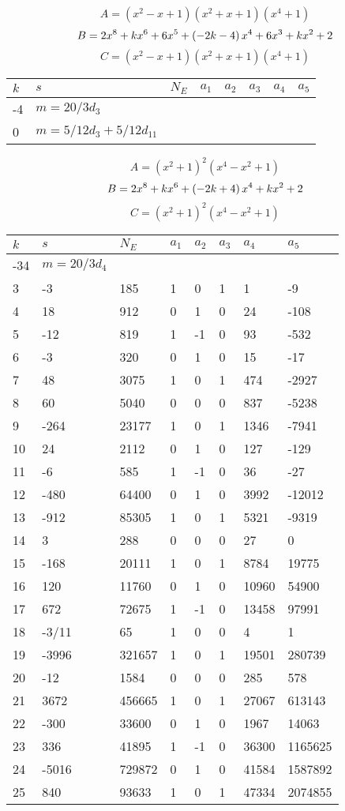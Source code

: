 \documentclass{amsart}
\begin{document}
$$A=(x^2
 - x
 + 1)(x^2
 + x
 + 1)(x^4
 + 1)$$
$$B=2\*x^8
 + k\*x^6
 + 6\*x^5
 + \left(-2\*k
 - 4\right) \*x^4
 + 6\*x^3
 + k\*x^2
 + 2$$
$$C=(x^2
 - x
 + 1)(x^2
 + x
 + 1)(x^4
 + 1)$$
\begin{longtable}{|l|l|l|lllll|}
\hline
$k$ & $s$ & $N_E$ & $a_1$ & $a_2$ & $a_3$ & $a_4$ & $a_5$\\
\hline
-4&$m=20/3d_{3}$&&\multicolumn{5}{c|}{}\\
0&$m=5/12d_{3}+5/12d_{11}$&&\multicolumn{5}{c|}{}\\
\hline
\end{longtable}
$$A=(x^2
 + 1)^{2}(x^4
 - x^2
 + 1)$$
$$B=2\*x^8
 + k\*x^6
 + \left(-2\*k
 + 4\right) \*x^4
 + k\*x^2
 + 2$$
$$C=(x^2
 + 1)^{2}(x^4
 - x^2
 + 1)$$
\begin{longtable}{|l|l|l|lllll|}
\hline
$k$ & $s$ & $N_E$ & $a_1$ & $a_2$ & $a_3$ & $a_4$ & $a_5$\\
\hline
-34&$m=20/3d_{4}$&&\multicolumn{5}{c|}{}\\
3&-3&185&1&0&1&1&-9\\
4&18&912&0&1&0&24&-108\\
5&-12&819&1&-1&0&93&-532\\
6&-3&320&0&1&0&15&-17\\
7&48&3075&1&0&1&474&-2927\\
8&60&5040&0&0&0&837&-5238\\
9&-264&23177&1&0&1&1346&-7941\\
10&24&2112&0&1&0&127&-129\\
11&-6&585&1&-1&0&36&-27\\
12&-480&64400&0&1&0&3992&-12012\\
13&-912&85305&1&0&1&5321&-9319\\
14&3&288&0&0&0&27&0\\
15&-168&20111&1&0&1&8784&19775\\
16&120&11760&0&1&0&10960&54900\\
17&672&72675&1&-1&0&13458&97991\\
18&-3/11&65&1&0&0&4&1\\
19&-3996&321657&1&0&1&19501&280739\\
20&-12&1584&0&0&0&285&578\\
21&3672&456665&1&0&1&27067&613143\\
22&-300&33600&0&1&0&1967&14063\\
23&336&41895&1&-1&0&36300&1165625\\
24&-5016&729872&0&1&0&41584&1587892\\
25&840&93633&1&0&1&47334&2074855\\

\end{longtable}
\end{document}
